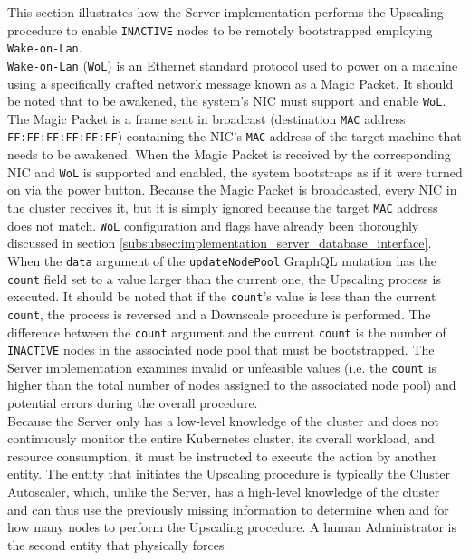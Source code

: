 This section illustrates how the Server implementation performs the Upscaling procedure
to enable \texttt{INACTIVE} nodes to be remotely bootstrapped employing \texttt{Wake-on-Lan}.
\\ %
\texttt{Wake-on-Lan} (\texttt{WoL}) is an Ethernet standard protocol used to power
on a machine using a specifically crafted network message known as a Magic Packet\cite{wake_on_lan}.
It should be noted that to be awakened, the system's NIC must support and enable
\texttt{WoL}. The Magic Packet is a frame sent in broadcast (destination \texttt{MAC}
address \texttt{FF:FF:FF:FF:FF:FF}) containing the NIC's \texttt{MAC} address of
the target machine that needs to be awakened. When the Magic Packet is received
by the corresponding NIC and \texttt{WoL} is supported and enabled, the system
bootstraps as if it were turned on via the power button. Because the Magic Packet
is broadcasted, every NIC in the cluster receives it, but it is simply ignored because
the target \texttt{MAC} address does not match. \texttt{WoL} configuration and
flags have already been thoroughly discussed in section
\ref{subsubsec:implementation_server_database_interface}. \\ %
When the \texttt{data} argument of the \texttt{updateNodePool} GraphQL mutation
has the \texttt{count} field set to a value larger than the current one, the
Upscaling process is executed. It should be noted that if the \texttt{count}'s
value is less than the current \texttt{count}, the process is reversed and a
Downscale procedure is performed. The difference between the \texttt{count}
argument and the current \texttt{count} is the number of \texttt{INACTIVE} nodes
in the associated node pool that must be bootstrapped. The Server implementation
examines invalid or unfeasible values (i.e. the \texttt{count} is higher than
the total number of nodes assigned to the associated node pool) and potential errors
during the overall procedure. \\ %
Because the Server only has a low-level knowledge of the cluster and does not continuously
monitor the entire Kubernetes cluster, its overall workload, and resource consumption,
it must be instructed to execute the action by another entity. The entity that initiates
the Upscaling procedure is typically the Cluster Autoscaler, which, unlike the Server,
has a high-level knowledge of the cluster and can thus use the previously
missing information to determine when and for how many nodes to perform the
Upscaling procedure. A human Administrator is the second entity that physically forces
